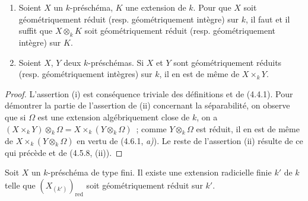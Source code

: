 \begin{proposition}[4.6.5]
\label{IV.2.4.6.5-fr}
\begin{enumerate}
\item[\textup{(i)}] Soient $X$ un $k$-préschéma, $K$ une extension de $k$. Pour que $X$
soit géométriquement réduit \textup{(resp.} géométriquement intègre\textup{)} sur $k$, il faut et
il suffit que $X\otimes_k K$ soit géométriquement réduit \textup{(resp.} géométriquement
intègre\textup{)} sur $K$.
\item[\textup{(ii)}] Soient $X$, $Y$ deux $k$-préschémas. Si $X$ et $Y$ sont
géométriquement réduits \textup{(resp.} géométriquement intègres\textup{)} sur $k$, il en est de
même de $X\times_k Y$.
\end{enumerate}
\end{proposition}

\begin{proof}
L'assertion (i) est conséquence triviale des définitions et de (4.4.1). Pour
démontrer la partie de l'assertion de (ii) concernant la séparabilité, on observe
que si $\Omega$ est une extension algébriquement close de $k$, on a
$(X\times_k Y)\otimes_k\Omega=X\times_k(Y\otimes_k\Omega)$~;
comme $Y\otimes_k\Omega$ est réduit, il en est de même de
$X\times_k(Y\otimes_k\Omega)$ en vertu de (4.6.1, \emph{a)}). Le reste de l'assertion
(ii) résulte de ce qui précède et de (4.5.8, (ii)).
\end{proof}

\begin{proposition}[4.6.6]
\label{IV.2.4.6.6-fr}
Soit $X$ un $k$-préschéma de type fini. Il existe une extension radicielle finie
$k'$ de $k$ telle que $(X_{(k')})_{\mathrm{red}}$ soit géométriquement réduit
sur $k'$.
\end{proposition}

